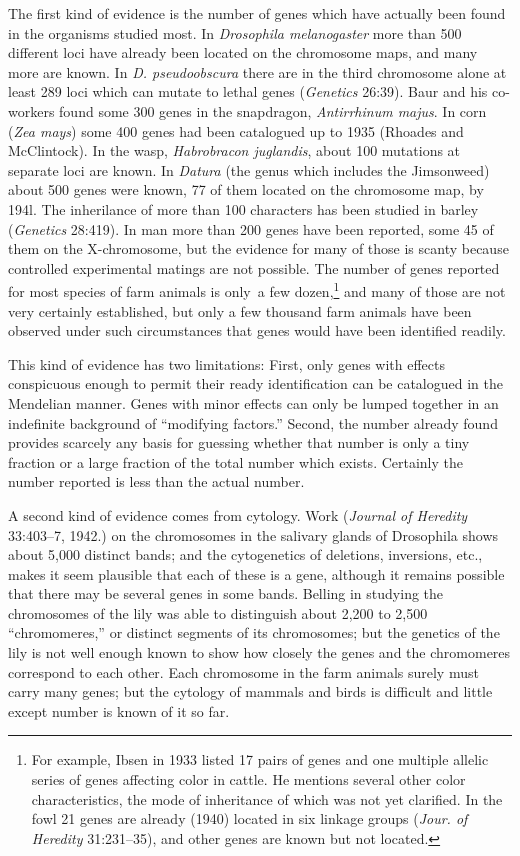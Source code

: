 The first kind of evidence is the number of genes which have actually been found in the organisms studied
most. In \textit{Drosophila melanogaster} more than 500 different loci have already been located on the
chromosome maps, and many more are known. In \textit{D. pseudoobscura} there are in the third chromosome
alone at least 289 loci which can mutate to lethal genes (\textit{Genetics} 26:39). Baur and his co-workers
found some 300 genes in the snapdragon, \textit{Antirrhinum majus}. In corn (\textit{Zea mays}) some 400
genes had been catalogued up to 1935 (Rhoades and McClintock). In the wasp, \textit{Habrobracon juglandis},
about 100 mutations at separate loci are known. In \textit{Datura} (the genus which includes the Jimsonweed)
about 500 genes were known, 77 of them located on the chromosome map, by 194l. The inherilance of more than
100 characters has been studied in barley (\textit{Genetics} 28:419). In man more than 200 genes have been
reported, some 45 of them on the X-chromosome, but the evidence for many of those is scanty because controlled
experimental matings are not possible. The number of genes reported for most species of farm animals is only\
a few dozen,\footnote{For example, Ibsen in 1933 listed 17 pairs of genes and one multiple allelic series of
genes affecting color in cattle. He mentions several other color characteristics, the mode of inheritance of
which was not yet clarified. In the fowl 21 genes are already (1940) located in six linkage groups
(\textit{Jour. of Heredity} 31:231--35), and other genes are known but not located.} and many of those are not
very certainly established, but only a few thousand farm animals have been observed under such circumstances
that genes would have been identified readily.

This kind of evidence has two limitations: First, only genes with effects conspicuous enough to permit their
ready identification can be catalogued in the Mendelian manner. Genes with minor effects can only be lumped
together in an indefinite background of ``modifying factors.'' Second, the number already found provides
scarcely any basis for guessing whether that number is only a tiny fraction or a large fraction of the total
number which exists. Certainly the number reported is less than the actual number.

A second kind of evidence comes from cytology. Work (\textit{Journal of Heredity} 33:403--7, 1942.) on the
\index{Chromosomes}chromosomes in the salivary glands of Drosophila shows about 5,000 distinct bands; and the cytogenetics of
deletions, inversions, etc., makes it seem plausible that each of these is a gene, although it remains
possible that there may be several genes in some bands. Belling in studying the chromosomes of the lily was
able to distinguish about 2,200 to 2,500 ``chromomeres,'' or distinct segments of its chromosomes; but the
genetics of the lily is not well enough known to show how closely the genes and the chromomeres correspond
to each other. Each chromosome in the farm animals surely must carry many genes; but the cytology of mammals
and birds is difficult and little except number is known of it so far.

